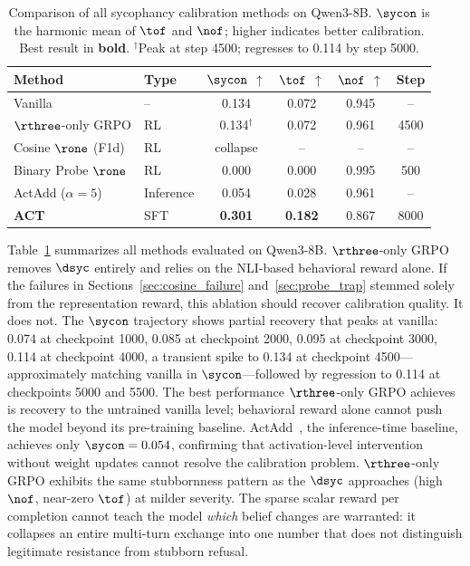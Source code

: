 \begin{table}[t]
\centering
\caption{Comparison of all sycophancy calibration methods on Qwen3-8B. $\sycon$ is the harmonic mean of $\tof$ and $\nof$; higher indicates better calibration. Best result in \textbf{bold}. $^\dagger$Peak at step 4500; regresses to 0.114 by step 5000.}
\label{tab:main_comparison}
\begin{tabular}{llcccc}
\toprule
Method & Type & $\sycon$ $\uparrow$ & $\tof$ $\uparrow$ & $\nof$ $\uparrow$ & Step \\
\midrule
Vanilla & -- & 0.134 & 0.072 & 0.945 & -- \\
$\rthree$-only GRPO & RL & 0.134$^\dagger$ & 0.072 & 0.961 & 4500 \\
Cosine $\rone$ (F1d) & RL & collapse & -- & -- & -- \\
Binary Probe $\rone$ & RL & 0.000 & 0.000 & 0.995 & 500 \\
ActAdd ($\alpha{=}5$) & Inference & 0.054 & 0.028 & 0.961 & -- \\
\textbf{ACT} & SFT & \textbf{0.301} & \textbf{0.182} & 0.867 & 8000 \\
\bottomrule
\end{tabular}
\end{table}

Table~\ref{tab:main_comparison} summarizes all methods evaluated on Qwen3-8B.
$\rthree$-only GRPO removes $\dsyc$ entirely and relies on the NLI-based behavioral reward alone.
If the failures in Sections~\ref{sec:cosine_failure} and~\ref{sec:probe_trap} stemmed solely from the representation reward, this ablation should recover calibration quality.
It does not.
The $\sycon$ trajectory shows partial recovery that peaks at vanilla: 0.074 at checkpoint 1000, 0.085 at checkpoint 2000, 0.095 at checkpoint 3000, 0.114 at checkpoint 4000, a transient spike to 0.134 at checkpoint 4500---approximately matching vanilla in $\sycon$---followed by regression to 0.114 at checkpoints 5000 and 5500.
The best performance $\rthree$-only GRPO achieves is recovery to the untrained vanilla level; behavioral reward alone cannot push the model beyond its pre-training baseline.
ActAdd~\citep{turner2023actadd}, the inference-time baseline, achieves only $\sycon = 0.054$, confirming that activation-level intervention without weight updates cannot resolve the calibration problem.
$\rthree$-only GRPO exhibits the same stubbornness pattern as the $\dsyc$ approaches (high $\nof$, near-zero $\tof$) at milder severity.
The sparse scalar reward per completion cannot teach the model \emph{which} belief changes are warranted: it collapses an entire multi-turn exchange into one number that does not distinguish legitimate resistance from stubborn refusal.

